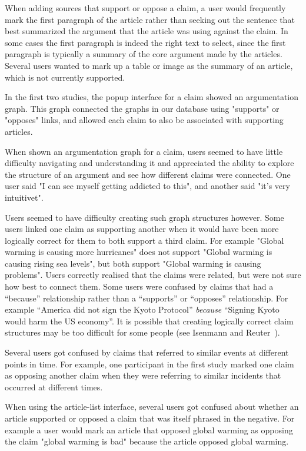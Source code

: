 \documentclass{www2010-submission}
\begin{document}
When adding sources that support or oppose a claim, a user would frequently mark the first paragraph of the article rather than seeking out the sentence that best summarized the argument that the article was using against the claim. In some cases the first paragraph is indeed the right text to select, since the first paragraph is typically a summary of the core argument made by the articles. Several users wanted to mark up a table or image as the summary of an article, which is not currently supported.

In the first two studies, the popup interface for a claim showed an argumentation graph. This graph connected the graphs in our database using "supports" or "opposes" links, and allowed each claim to also be associated with supporting articles. 

When shown an argumentation graph for a claim, users seemed to have little difficulty navigating and understanding it and appreciated the ability to explore the structure of an argument and see how different claims were connected. One user said "I can see myself getting addicted to this", and another said "it's very intuitivet".

Users seemed to have difficulty creating such graph structures however. Some users linked one claim as supporting another when it would have been more logically correct for them to both support a third claim. For example "Global warming is causing more hurricanes" does not support "Global warming is causing rising sea levels", but both support "Global warming is causing problems". Users correctly realised that the claims were related, but were not sure how best to connect them. Some users were confused by claims that had a ``because'' relationship rather than a ``supports'' or ``opposes'' relationship. For example ``America did not sign the Kyoto Protocol'' {\it because} ``Signing Kyoto would harm the US economy''. It is possible that creating logically correct claim structures may be too difficult for some people (see Isenmann and Reuter~\cite{Isenmann1997}).

Several users got confused by claims that referred to similar events at different points in time. For example, one participant in the first study marked one claim as opposing another claim when they were referring to similar incidents that occurred at different times. 

When using the article-list interface, several users got confused about whether an article supported or opposed a claim that was itself phrased in the negative. For example a user would mark an article that opposed global warming as opposing the claim "global warming is bad" because the article opposed global warming.
\end{document}
